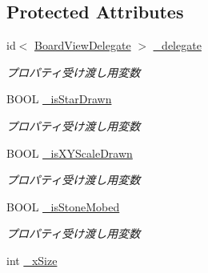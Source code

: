 \subsection*{Protected Attributes}
\begin{DoxyCompactItemize}
\item 
\hypertarget{interface_board_view_afbb741010571202a5b270c4521c52c03}{
id$<$ \hyperlink{protocol_board_view_delegate-p}{BoardViewDelegate} $>$ \hyperlink{interface_board_view_afbb741010571202a5b270c4521c52c03}{\_\-delegate}}
\label{interface_board_view_afbb741010571202a5b270c4521c52c03}

\begin{DoxyCompactList}\small\item\em プロパティ受け渡し用変数 \end{DoxyCompactList}\item 
\hypertarget{interface_board_view_ad4989ff0737c80e88b737b48f0ab7c89}{
BOOL \hyperlink{interface_board_view_ad4989ff0737c80e88b737b48f0ab7c89}{\_\-isStarDrawn}}
\label{interface_board_view_ad4989ff0737c80e88b737b48f0ab7c89}

\begin{DoxyCompactList}\small\item\em プロパティ受け渡し用変数 \end{DoxyCompactList}\item 
\hypertarget{interface_board_view_ad4f563bf4e7fd5a54953dbb85c1b4ba3}{
BOOL \hyperlink{interface_board_view_ad4f563bf4e7fd5a54953dbb85c1b4ba3}{\_\-isXYScaleDrawn}}
\label{interface_board_view_ad4f563bf4e7fd5a54953dbb85c1b4ba3}

\begin{DoxyCompactList}\small\item\em プロパティ受け渡し用変数 \end{DoxyCompactList}\item 
\hypertarget{interface_board_view_a4fc8faf205467309abd8af760d9e9e86}{
BOOL \hyperlink{interface_board_view_a4fc8faf205467309abd8af760d9e9e86}{\_\-isStoneMobed}}
\label{interface_board_view_a4fc8faf205467309abd8af760d9e9e86}

\begin{DoxyCompactList}\small\item\em プロパティ受け渡し用変数 \end{DoxyCompactList}\item 
\hypertarget{interface_board_view_ac02174b90d76f01f5641563c9a6675c2}{
int \hyperlink{interface_board_view_ac02174b90d76f01f5641563c9a6675c2}{\_\-xSize}}
\label{interface_board_view_ac02174b90d76f01f5641563c9a6675c2}


\end{DoxyCompactItemize}
